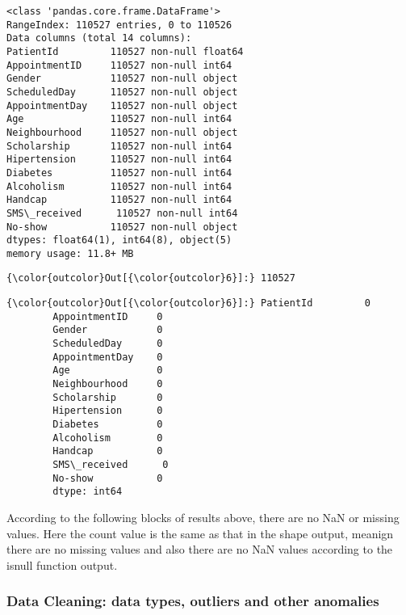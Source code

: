 \documentclass[11pt]{article}
\begin{document}
    \begin{Verbatim}[commandchars=\\\{\}]
<class 'pandas.core.frame.DataFrame'>
RangeIndex: 110527 entries, 0 to 110526
Data columns (total 14 columns):
PatientId         110527 non-null float64
AppointmentID     110527 non-null int64
Gender            110527 non-null object
ScheduledDay      110527 non-null object
AppointmentDay    110527 non-null object
Age               110527 non-null int64
Neighbourhood     110527 non-null object
Scholarship       110527 non-null int64
Hipertension      110527 non-null int64
Diabetes          110527 non-null int64
Alcoholism        110527 non-null int64
Handcap           110527 non-null int64
SMS\_received      110527 non-null int64
No-show           110527 non-null object
dtypes: float64(1), int64(8), object(5)
memory usage: 11.8+ MB

    \end{Verbatim}

\begin{Verbatim}[commandchars=\\\{\}]
{\color{outcolor}Out[{\color{outcolor}6}]:} 110527
\end{Verbatim}
            
\begin{Verbatim}[commandchars=\\\{\}]
{\color{outcolor}Out[{\color{outcolor}6}]:} PatientId         0
        AppointmentID     0
        Gender            0
        ScheduledDay      0
        AppointmentDay    0
        Age               0
        Neighbourhood     0
        Scholarship       0
        Hipertension      0
        Diabetes          0
        Alcoholism        0
        Handcap           0
        SMS\_received      0
        No-show           0
        dtype: int64
\end{Verbatim}
            
    According to the following blocks of results above, there are no NaN or
missing values. Here the count value is the same as that in the shape
output, meanign there are no missing values and also there are no NaN
values according to the isnull function output.

    \subsubsection{Data Cleaning: data types, outliers and other
anomalies}\label{data-cleaning-data-types-outliers-and-other-anomalies}
\end{document}
